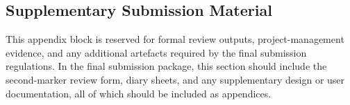 \documentclass[12pt,a4paper]{article}
\begin{document}



\newpage
\begin{appendices}

\section{Supplementary Submission Material}
This appendix block is reserved for formal review outputs, project-management evidence, and any additional artefacts required by the final submission regulations. In the final submission package, this section should include the second-marker review form, diary sheets, and any supplementary design or user documentation, all of which should be included as appendices.

\end{appendices}
\end{document}
